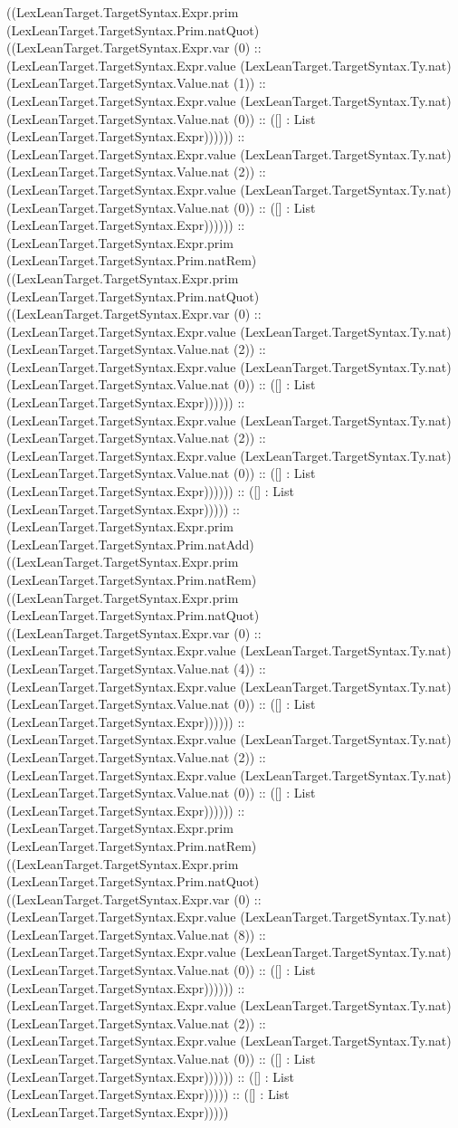 \documentclass[11pt]{article}
\begin{document}
((LexLeanTarget.TargetSyntax.Expr.prim (LexLeanTarget.TargetSyntax.Prim.natQuot) ((LexLeanTarget.TargetSyntax.Expr.var (0) :: (LexLeanTarget.TargetSyntax.Expr.value (LexLeanTarget.TargetSyntax.Ty.nat) (LexLeanTarget.TargetSyntax.Value.nat (1)) :: (LexLeanTarget.TargetSyntax.Expr.value (LexLeanTarget.TargetSyntax.Ty.nat) (LexLeanTarget.TargetSyntax.Value.nat (0)) :: ([] : List (LexLeanTarget.TargetSyntax.Expr)))))) :: (LexLeanTarget.TargetSyntax.Expr.value (LexLeanTarget.TargetSyntax.Ty.nat) (LexLeanTarget.TargetSyntax.Value.nat (2)) :: (LexLeanTarget.TargetSyntax.Expr.value (LexLeanTarget.TargetSyntax.Ty.nat) (LexLeanTarget.TargetSyntax.Value.nat (0)) :: ([] : List (LexLeanTarget.TargetSyntax.Expr)))))) :: (LexLeanTarget.TargetSyntax.Expr.prim (LexLeanTarget.TargetSyntax.Prim.natRem) ((LexLeanTarget.TargetSyntax.Expr.prim (LexLeanTarget.TargetSyntax.Prim.natQuot) ((LexLeanTarget.TargetSyntax.Expr.var (0) :: (LexLeanTarget.TargetSyntax.Expr.value (LexLeanTarget.TargetSyntax.Ty.nat) (LexLeanTarget.TargetSyntax.Value.nat (2)) :: (LexLeanTarget.TargetSyntax.Expr.value (LexLeanTarget.TargetSyntax.Ty.nat) (LexLeanTarget.TargetSyntax.Value.nat (0)) :: ([] : List (LexLeanTarget.TargetSyntax.Expr)))))) :: (LexLeanTarget.TargetSyntax.Expr.value (LexLeanTarget.TargetSyntax.Ty.nat) (LexLeanTarget.TargetSyntax.Value.nat (2)) :: (LexLeanTarget.TargetSyntax.Expr.value (LexLeanTarget.TargetSyntax.Ty.nat) (LexLeanTarget.TargetSyntax.Value.nat (0)) :: ([] : List (LexLeanTarget.TargetSyntax.Expr)))))) :: ([] : List (LexLeanTarget.TargetSyntax.Expr))))) :: (LexLeanTarget.TargetSyntax.Expr.prim (LexLeanTarget.TargetSyntax.Prim.natAdd) ((LexLeanTarget.TargetSyntax.Expr.prim (LexLeanTarget.TargetSyntax.Prim.natRem) ((LexLeanTarget.TargetSyntax.Expr.prim (LexLeanTarget.TargetSyntax.Prim.natQuot) ((LexLeanTarget.TargetSyntax.Expr.var (0) :: (LexLeanTarget.TargetSyntax.Expr.value (LexLeanTarget.TargetSyntax.Ty.nat) (LexLeanTarget.TargetSyntax.Value.nat (4)) :: (LexLeanTarget.TargetSyntax.Expr.value (LexLeanTarget.TargetSyntax.Ty.nat) (LexLeanTarget.TargetSyntax.Value.nat (0)) :: ([] : List (LexLeanTarget.TargetSyntax.Expr)))))) :: (LexLeanTarget.TargetSyntax.Expr.value (LexLeanTarget.TargetSyntax.Ty.nat) (LexLeanTarget.TargetSyntax.Value.nat (2)) :: (LexLeanTarget.TargetSyntax.Expr.value (LexLeanTarget.TargetSyntax.Ty.nat) (LexLeanTarget.TargetSyntax.Value.nat (0)) :: ([] : List (LexLeanTarget.TargetSyntax.Expr)))))) :: (LexLeanTarget.TargetSyntax.Expr.prim (LexLeanTarget.TargetSyntax.Prim.natRem) ((LexLeanTarget.TargetSyntax.Expr.prim (LexLeanTarget.TargetSyntax.Prim.natQuot) ((LexLeanTarget.TargetSyntax.Expr.var (0) :: (LexLeanTarget.TargetSyntax.Expr.value (LexLeanTarget.TargetSyntax.Ty.nat) (LexLeanTarget.TargetSyntax.Value.nat (8)) :: (LexLeanTarget.TargetSyntax.Expr.value (LexLeanTarget.TargetSyntax.Ty.nat) (LexLeanTarget.TargetSyntax.Value.nat (0)) :: ([] : List (LexLeanTarget.TargetSyntax.Expr)))))) :: (LexLeanTarget.TargetSyntax.Expr.value (LexLeanTarget.TargetSyntax.Ty.nat) (LexLeanTarget.TargetSyntax.Value.nat (2)) :: (LexLeanTarget.TargetSyntax.Expr.value (LexLeanTarget.TargetSyntax.Ty.nat) (LexLeanTarget.TargetSyntax.Value.nat (0)) :: ([] : List (LexLeanTarget.TargetSyntax.Expr)))))) :: ([] : List (LexLeanTarget.TargetSyntax.Expr))))) :: ([] : List (LexLeanTarget.TargetSyntax.Expr))))) 
\end{document}
